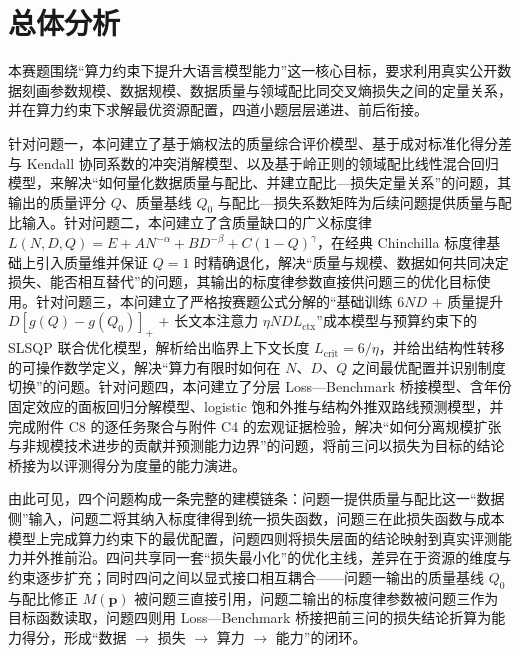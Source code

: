 
\section{总体分析}

本赛题围绕“算力约束下提升大语言模型能力”这一核心目标，要求利用真实公开数据刻画参数规模、数据规模、数据质量与领域配比同交叉熵损失之间的定量关系，并在算力约束下求解最优资源配置，四道小题层层递进、前后衔接。

针对问题一，本问建立了基于熵权法的质量综合评价模型、基于成对标准化得分差与 Kendall 协同系数的冲突消解模型、以及基于岭正则的领域配比线性混合回归模型，来解决“如何量化数据质量与配比、并建立配比—损失定量关系”的问题，其输出的质量评分 $Q$、质量基线 $Q_0$ 与配比—损失系数矩阵为后续问题提供质量与配比输入。针对问题二，本问建立了含质量缺口的广义标度律 $L(N,D,Q)=E+AN^{-\alpha}+BD^{-\beta}+C(1-Q)^{\gamma}$，在经典 Chinchilla 标度律基础上引入质量维并保证 $Q=1$ 时精确退化，解决“质量与规模、数据如何共同决定损失、能否相互替代”的问题，其输出的标度律参数直接供问题三的优化目标使用。针对问题三，本问建立了严格按赛题公式分解的“基础训练 $6ND$ $+$ 质量提升 $D[g(Q)-g(Q_0)]_+$ $+$ 长文本注意力 $\eta NDL_{\text{ctx}}$”成本模型与预算约束下的 SLSQP 联合优化模型，解析给出临界上下文长度 $L_{\text{crit}}=6/\eta$，并给出结构性转移的可操作数学定义，解决“算力有限时如何在 $N$、$D$、$Q$ 之间最优配置并识别制度切换”的问题。针对问题四，本问建立了分层 Loss—Benchmark 桥接模型、含年份固定效应的面板回归分解模型、logistic 饱和外推与结构外推双路线预测模型，并完成附件 C8 的逐任务聚合与附件 C4 的宏观证据检验，解决“如何分离规模扩张与非规模技术进步的贡献并预测能力边界”的问题，将前三问以损失为目标的结论桥接为以评测得分为度量的能力演进。

由此可见，四个问题构成一条完整的建模链条：问题一提供质量与配比这一“数据侧”输入，问题二将其纳入标度律得到统一损失函数，问题三在此损失函数与成本模型上完成算力约束下的最优配置，问题四则将损失层面的结论映射到真实评测能力并外推前沿。四问共享同一套“损失最小化”的优化主线，差异在于资源的维度与约束逐步扩充；同时四问之间以显式接口相互耦合——问题一输出的质量基线 $Q_0$ 与配比修正 $M(\bm p)$ 被问题三直接引用，问题二输出的标度律参数被问题三作为目标函数读取，问题四则用 Loss—Benchmark 桥接把前三问的损失结论折算为能力得分，形成“数据 $\to$ 损失 $\to$ 算力 $\to$ 能力”的闭环。
